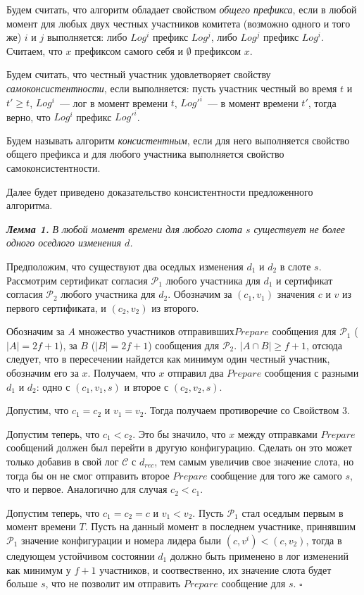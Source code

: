 Будем считать, что алгоритм обладает свойством \textit{общего префикса}, если в любой момент для любых двух честных участников комитета (возможно одного и того же) $i$ и $j$ выполняется: либо $Log^i$ префикс $Log^j$, либо $Log^j$ префикс $Log^i$. Считаем, что $x$ префиксом самого себя и $\emptyset$ префиксом $x$.

Будем считать, что честный участник удовлетворяет свойству \textit{самоконсистентности}, если выполняется: пусть участник честный во время $t$ и $t' \ge t$, $Log^i$~--- лог в момент времени $t$, $Log'^i$~--- в момент времени $t'$, тогда верно, что $Log^i$ префикс $Log'^i$.

Будем называть алгоритм \textit{консистентным}, если для него выполняется свойство общего префикса и для любого участника выполняется свойство самоконсистентности.
 
Далее будет приведено доказательство консистентности предложенного алгоритма.

\textbf{\textit{Лемма 1.}} \textit{В любой момент времени для любого слота $s$ существует не более одного оседлого изменения $d$.}

Предположим, что существуют два оседлых изменения $d_1$ и $d_2$ в слоте $s$. Рассмотрим сертификат согласия $\mathcal{P}_1$ любого участника для $d_1$ и сертификат согласия $\mathcal{P}_2$ любого участника для $d_2$. Обозначим за $(c_1, v_1)$ значения $c$ и $v$ из первого сертификата, и $(c_2, v_2)$ из второго.

Обозначим за $A$ множество участников отправивших$Prepare$ сообщения для  $\mathcal{P}_1$ ($|A|=2f+1$), за $B$ ($|B|=2f+1$) сообщения для $\mathcal{P}_2$. $|A \cap B| \ge f+1$, отсюда следует, что в пересечении найдется как минимум один честный участник,  обозначим его за $x$. Получаем, что $x$ отправил два $Prepare$ сообщения с разными $d_1$ и $d_2$: одно с $(c_1, v_1, s)$ и второе с $(c_2, v_2, s)$.

Допустим, что $c_1 = c_2$ и  $v_1 = v_2$. Тогда получаем противоречие со Свойством 3.

Допустим теперь, что $c_1 < c_2$. Это бы значило, что $x$ между отправками $Prepare$ сообщений должен был перейти в другую конфигурацию. Сделать он это может только добавив в свой лог $\mathcal{C}$ с $d_{rec}$, тем самым увеличив свое значение слота, но тогда бы он не смог отправить второе $Prepare$ сообщение для того же самого $s$, что и первое. Аналогично для случая $c_2 < c_1$.

Допустим теперь, что $c_1=c_2=c$ и $v_1 < v_2$. Пусть $\mathcal{P}_1$ стал оседлым первым в момент времени  $T$. Пусть на данный момент в последнем участнике, принявшим $\mathcal{P}_1$ значение конфигурации и номера лидера были $(c, v^i) < (c, v_2)$, тогда в следующем устойчивом состоянии $d_1$ должно быть применено в лог изменений как минимум у $f+1$ участников, и соотвественно, их значение слота будет больше $s$, что не позволит им отправить $Prepare$ сообщение для $s$. $\square$
\vspace{10pt}

